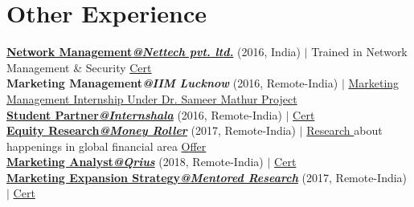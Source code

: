 \documentclass[letterpaper,11pt]{article}
\begin{document}
%
\section{\small Other Experience}
 \begin{itemize}[leftmargin=0.15in, label={}]
    \small{\item{
     \textbf{\href{https://www.nettech.in/}{\footnotesize Network Management\textnormal {\textit {@Nettech pvt. ltd.}}}}{ (\footnotesize 2016, India)} $|$ {\scriptsize Trained in Network Management \& Security {\href{https://drive.google.com/file/d/1MTiRwlG4pS1uhK9qbJE4hODRcdFwT6jP/view}{{\color{blue}Cert}}}} \\
     
     \textbf{{\footnotesize Marketing Management\textnormal {\textit {@IIM Lucknow}}}}{ (\footnotesize 2016, Remote-India)} $|$ {\href{http://www.iiml.ac.in/faculty-profile}{\scriptsize Marketing Management Internship Under Dr. Sameer Mathur }}{\href{https://docs.google.com/document/d/1SZPTD0Dh0R6yR9n3aVkX8rEhogbIoq_1BwiE9ibIjRQ/edit}{\color{blue}\scriptsize Project}}\\
     
     \textbf{\href{https://internshala.com/}{\footnotesize Student Partner\textnormal {\textit {@Internshala}}}} {(\footnotesize 2016, Remote-India)} $|$ {{\href{https://drive.google.com/file/d/0BxM540VPs0PdZkk0UUVQcXYxc28/view}{{\color{blue}\scriptsize Cert}}}}\\
     
     \textbf{\href{https://themoneyroller.com/}{\footnotesize Equity Research\textnormal{\textit{@Money Roller}}}} {(\footnotesize 2017, Remote-India)} $|$ {\href{https://drive.google.com/file/d/0BxM540VPs0PdUVlSbmp0dGNqNHc/view}{\scriptsize
        \color{blue}Research }}{\scriptsize about happenings in global financial area}
        {{\href{https://drive.google.com/file/d/0BxM540VPs0PdNjZCVnM3Y3ZNbGc/view}{{\color{blue}\scriptsize Offer}}}}  \\
        
        \textbf{\href{https://qrius.com/}{\footnotesize Marketing Analyst\textnormal {\textit {@Qrius}}}}{ (\footnotesize 2018, Remote-India)} $|$ {\href{https://drive.google.com/file/d/1R0Ij_YFwhWbAhvwd76BU0s7_V7-SYjd9/view}{\scriptsize
        \color{blue}Cert}}  \\
        
        \textbf{\href{https://www.mentored-research.com/}{\footnotesize Marketing Expansion Strategy\textnormal {\textit {@Mentored Research}}}}{ (\footnotesize 2017, Remote-India)} $|$ {\href{https://drive.google.com/file/d/0BxM540VPs0PdczlZZVp6LUJEY0E/view}{\scriptsize
        \color{blue}Cert}}  \\
        
}}
\end{itemize}
\end{document}

